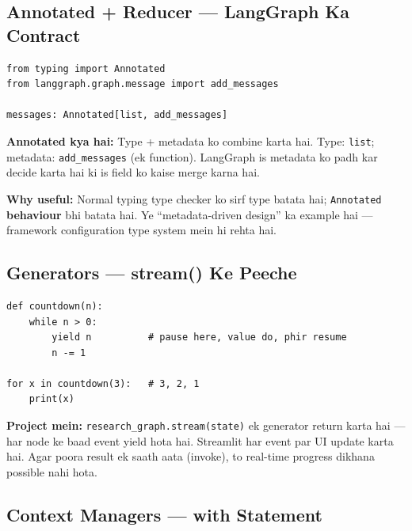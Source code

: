 \subsection{Annotated + Reducer --- LangGraph Ka Contract}

\begin{codestorybox}
\begin{lstlisting}[style=pythonstyle]
from typing import Annotated
from langgraph.graph.message import add_messages

messages: Annotated[list, add_messages]
\end{lstlisting}

\textbf{Annotated kya hai:} Type + metadata ko combine karta hai. Type: \texttt{list}; metadata: \texttt{add\_messages} (ek function). LangGraph is metadata ko padh kar decide karta hai ki is field ko kaise merge karna hai.

\textbf{Why useful:} Normal typing type checker ko sirf type batata hai; \texttt{Annotated} \textbf{behaviour} bhi batata hai. Ye ``metadata-driven design'' ka example hai --- framework configuration type system mein hi rehta hai.
\end{codestorybox}

\subsection{Generators --- stream() Ke Peeche}

\begin{codestorybox}
\begin{lstlisting}[style=pythonstyle, caption={Generator concept}]
def countdown(n):
    while n > 0:
        yield n          # pause here, value do, phir resume
        n -= 1

for x in countdown(3):   # 3, 2, 1
    print(x)
\end{lstlisting}

\textbf{Project mein:} \texttt{research\_graph.stream(state)} ek generator return karta hai --- har node ke baad event yield hota hai. Streamlit har event par UI update karta hai. Agar poora result ek saath aata (invoke), to real-time progress dikhana possible nahi hota.
\end{codestorybox}

\subsection{Context Managers --- with Statement}


